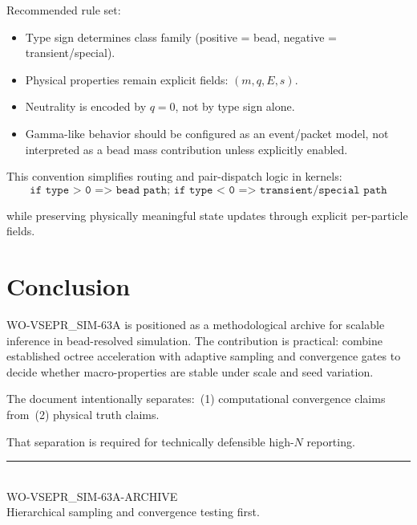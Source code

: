 \documentclass[11pt, a4paper, oneside]{article}
\begin{document}
Recommended rule set:
\begin{itemize}
  \item Type sign determines class family (positive = bead, negative = transient/special).
  \item Physical properties remain explicit fields: $(m, q, E, s)$.
  \item Neutrality is encoded by $q=0$, not by type sign alone.
  \item Gamma-like behavior should be configured as an event/packet model,
	not interpreted as a bead mass contribution unless explicitly enabled.
\end{itemize}

This convention simplifies routing and pair-dispatch logic in kernels:
\begin{equation}
\texttt{if type > 0 => bead path; if type < 0 => transient/special path}
\end{equation}

while preserving physically meaningful state updates through explicit
per-particle fields.

\section{Conclusion}

WO-VSEPR\_SIM-63A is positioned as a methodological archive for scalable inference in bead-resolved simulation.
The contribution is practical: combine established octree acceleration with adaptive sampling and convergence gates to decide whether macro-properties are stable under scale and seed variation.

The document intentionally separates:\
(1) computational convergence claims from\
(2) physical truth claims.

That separation is required for technically defensible high-$N$ reporting.

\vfill
\begin{center}
\rule{0.45\linewidth}{0.4pt}\\[0.5em]
\small WO-VSEPR\_SIM-63A-ARCHIVE\\
\small Hierarchical sampling and convergence testing first.
\end{center}
\end{document}
